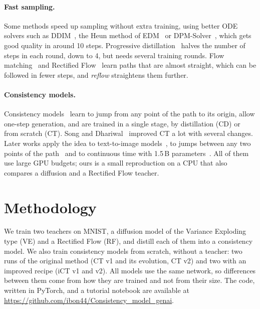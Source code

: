 \documentclass{article}
\begin{document}
\paragraph{Fast sampling.} Some methods speed up sampling without extra
training, using better ODE solvers such as DDIM~\cite{song2021ddim}, the Heun
method of EDM~\cite{karras2022edm} or DPM-Solver~\cite{lu2022dpmsolver}, which
gets good quality in around 10 steps. Progressive
distillation~\cite{salimans2022progressive} halves the number of steps in each
round, down to 4, but needs several training rounds. Flow
matching~\cite{lipman2023flow} and Rectified Flow~\cite{liu2023flow} learn
paths that are almost straight, which can be followed in fewer steps, and
\emph{reflow} straightens them further.

\paragraph{Consistency models.} Consistency
models~\cite{song2023consistency} learn to jump from any point of the path to
its origin, allow one-step generation, and are trained in a single stage, by
distillation (CD) or from scratch (CT). Song and
Dhariwal~\cite{song2024improved} improved CT a lot with several changes. Later
works apply the idea to text-to-image models~\cite{luo2023lcm}, to jumps
between any two points of the path~\cite{kim2024ctm} and to continuous time
with 1.5\,B parameters~\cite{lu2025scm}. All of them use large GPU budgets; ours
is a small reproduction on a CPU that also compares a diffusion and a Rectified
Flow teacher.

\section{Methodology}
\label{sec:methodology}

We train two teachers on MNIST, a diffusion model of the Variance Exploding
type (VE) and a Rectified Flow (RF), and distill each of them into a
consistency model. We also train consistency models from scratch, without a
teacher: two runs of the original method (CT v1 and its evolution, CT v2) and
two with an improved recipe (iCT v1 and v2). All models use the same network, so differences between them come from
how they are trained and not from their size. The code, written in PyTorch,
and a tutorial notebook are available at
\url{https://github.com/ibon44/Consistency_model_genai}.
\end{document}
